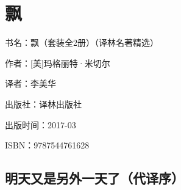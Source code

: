 

\section{飘}



\par 书名：飘（套装全2册）（译林名著精选）
\par 作者：[美]玛格丽特·米切尔
\par 译者：李美华
\par 出版社：译林出版社
\par 出版时间：2017-03
\par ISBN：9787544761628



\subsection{明天又是另外一天了（代译序）}

